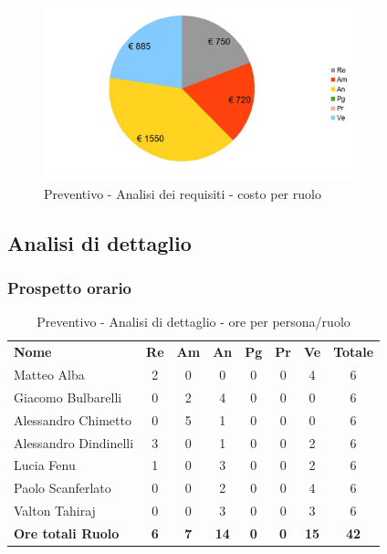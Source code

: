 		\begin{figure} [h!]
			\centering
			\includegraphics[width=0.8\textwidth]{res/img/grafici/analisi_dei_requisiti_costo.jpg}
			\caption{Preventivo - Analisi dei requisiti - costo per ruolo} 
		\end{figure}

\newpage

\subsection{Analisi di dettaglio}

	\subsubsection{Prospetto orario}
	
		\begin{table} [h!]
			\begin{center}
				\begin{tabular} { m{3.5cm} c c c c c c c }
					\rowcolor{lightgray}
					\textbf{Nome} & \textbf{Re} & \textbf{Am} & \textbf{An} & \textbf{Pg} & \textbf{Pr} & \textbf{Ve} & \textbf{Totale} \\
					Matteo Alba & 2 & 0 & 0 & 0 & 0 & 4 & 6 \\
					Giacomo Bulbarelli & 0 & 2 & 4 & 0 & 0 & 0 & 6 \\
					Alessandro Chimetto & 0 & 5 & 1 & 0 & 0 & 0 & 6 \\
					Alessandro Dindinelli & 3 & 0 & 1 & 0 & 0 & 2 & 6 \\
					Lucia Fenu & 1 & 0 & 3 & 0 & 0 & 2 & 6 \\
					Paolo Scanferlato & 0 & 0 & 2 & 0 & 0 & 4 & 6 \\
					Valton Tahiraj & 0 & 0 & 3 & 0 & 0 & 3 & 6 \\
					\textbf{Ore totali Ruolo} & \textbf{6} & \textbf{7} & \textbf{14} & \textbf{0} & \textbf{0}& \textbf{15} & \textbf{42}
				\end{tabular}
				\caption{Preventivo - Analisi di dettaglio - ore per persona/ruolo}
			\end{center}
		\end{table}
	
